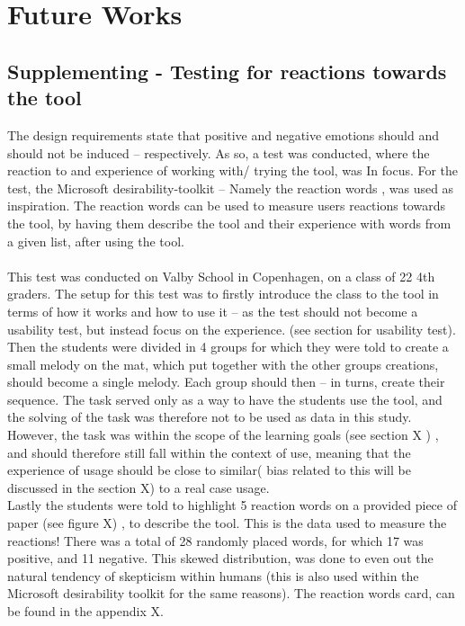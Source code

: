 \chapter{Future Works}
\section{Supplementing - Testing for reactions towards the tool}
The design requirements state that positive and negative emotions should and should not be induced – respectively. As so, a test was conducted, where the reaction to and experience of working with/ trying the tool, was In focus. For the test, the Microsoft desirability-toolkit – Namely the reaction words \cite{reactionWords}, was used as inspiration. The reaction words can be used to measure users reactions towards the tool, by having them describe the tool and their experience with words from a given list, after using the tool.\\\\
This test was conducted on Valby School in Copenhagen, on a class of 22 4th graders. The setup for this test was to firstly introduce the class to the tool in terms of how it works and how to use it – as the test should not become a usability test, but instead focus on the experience. (see section for usability test). Then the students were divided in 4 groups for which they were told to create a small melody on the mat, which put together with the other groups creations, should become a single melody. Each group should then – in turns, create their sequence. The task served only as a way to have the students use the tool, and the solving of the task was therefore not to be used as data in this study. However, the task was within the scope of the learning goals (see section X ) , and should therefore still fall within the context of use, meaning that the experience of usage should be close to similar( bias related to this will be discussed in the section X) to a real case usage.    
\newline
\\
Lastly the students were told to highlight 5 reaction words on a provided piece of paper (see figure X) , to describe the tool. This is the data used to measure the reactions! There was a total of 28 randomly placed words, for which 17 was positive, and 11 negative. This skewed distribution, was done to even out the natural tendency of skepticism within humans (this is also used within the Microsoft desirability toolkit for the same reasons).  The reaction words card, can be found in the appendix X. 

